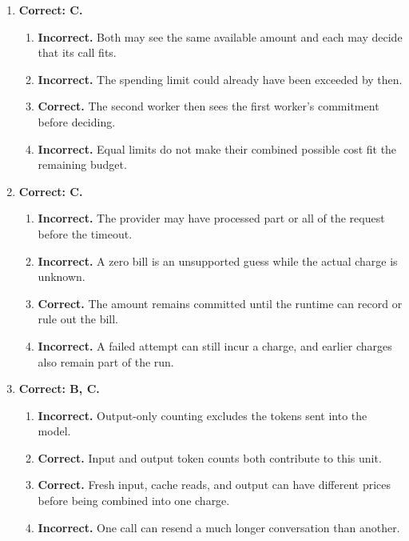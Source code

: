 \begin{enumerate}[start=51,itemsep=0.7\baselineskip]
\item[{\hyperref[exercise:54]{54.}}] \begin{minipage}[t]{\linewidth}
\textbf{Correct: C.}
\begin{enumerate}[label=\textnormal{(\Alph*)},leftmargin=*,itemsep=0pt]
\item \textbf{Incorrect.} Both may see the same available amount and each may decide that its call fits.
\item \textbf{Incorrect.} The spending limit could already have been exceeded by then.
\item \textbf{Correct.} The second worker then sees the first worker's commitment before deciding.
\item \textbf{Incorrect.} Equal limits do not make their combined possible cost fit the remaining budget.
\end{enumerate}
\end{minipage}

\item[{\hyperref[exercise:55]{55.}}] \begin{minipage}[t]{\linewidth}
\textbf{Correct: C.}
\begin{enumerate}[label=\textnormal{(\Alph*)},leftmargin=*,itemsep=0pt]
\item \textbf{Incorrect.} The provider may have processed part or all of the request before the timeout.
\item \textbf{Incorrect.} A zero bill is an unsupported guess while the actual charge is unknown.
\item \textbf{Correct.} The amount remains committed until the runtime can record or rule out the bill.
\item \textbf{Incorrect.} A failed attempt can still incur a charge, and earlier charges also remain part of the run.
\end{enumerate}
\end{minipage}

\item[{\hyperref[exercise:56]{56.}}] \begin{minipage}[t]{\linewidth}
\textbf{Correct: B, C.}
\begin{enumerate}[label=\textnormal{(\Alph*)},leftmargin=*,itemsep=0pt]
\item \textbf{Incorrect.} Output-only counting excludes the tokens sent into the model.
\item \textbf{Correct.} Input and output token counts both contribute to this unit.
\item \textbf{Correct.} Fresh input, cache reads, and output can have different prices before being combined into one charge.
\item \textbf{Incorrect.} One call can resend a much longer conversation than another.
\end{enumerate}
\end{minipage}


\end{enumerate}
